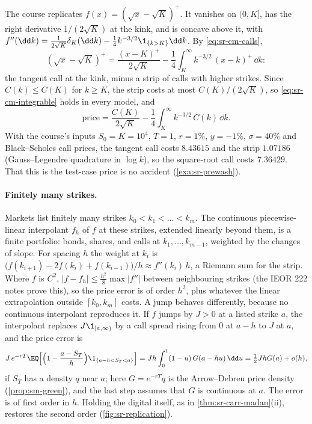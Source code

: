 \begin{example}\label{exa:sr-sqrt}
The course replicates $f(x)=(\sqrt x-\sqrt K)^+$. It vanishes on $(0,K]$, has the right derivative
$1/(2\sqrt K)$ at the kink, and is concave above it, with
$f''(\dd k)=\frac1{2\sqrt K}\delta_K(\dd k)-\frac14k^{-3/2}\1_{\{k>K\}}\dd k$. By \eqref{eq:sr-cm-calls},
\[
  (\sqrt x-\sqrt K)^+=\frac{(x-K)^+}{2\sqrt K}-\frac14\int_K^\infty k^{-3/2}\,(x-k)^+\,\dd k :
\]
the tangent call at the kink, minus a strip of calls with higher strikes. Since $C(k)\le C(K)$ for $k\ge K$,
the strip costs at most $C(K)/(2\sqrt K)$, so \eqref{eq:sr-cm-integrable} holds in every model, and
\[
  \text{price}=\frac{C(K)}{2\sqrt K}-\frac14\int_K^\infty k^{-3/2}\,C(k)\,\dd k .
\]
With the course's inputs $S_0=K=10^4$, $T=1$, $r=1\%$, $y=-1\%$, $\sigma=40\%$ and Black--Scholes call prices,
the tangent call costs $8.43615$ and the strip $1.07186$ (Gauss--Legendre quadrature in $\log k$), so the
square-root call costs $7.36429$. That this is the test-case price is no accident (\cref{exa:sr-prewash}).
\end{example}

\paragraph{Finitely many strikes.} Markets list finitely many strikes $k_0<k_1<\dots<k_m$. The
continuous piecewise-linear interpolant $f_h$ of $f$ at these strikes, extended linearly beyond them, is
a finite portfolio: bonds, shares, and calls at $k_1,\dots,k_{m-1}$, weighted by the changes of slope. For
spacing $h$ the weight at $k_i$ is $\big(f(k_{i+1})-2f(k_i)+f(k_{i-1})\big)/h\approx f''(k_i)\,h$, a Riemann sum
for the strip. Where $f$ is $C^2$, $|f-f_h|\le\frac{h^2}8\max|f''|$ between neighbouring strikes (the IEOR 222
notes prove this), so the price error is of order $h^2$, plus whatever the linear extrapolation outside
$[k_0,k_m]$ costs. A jump behaves differently, because no continuous interpolant reproduces it. If $f$ jumps
by $J>0$ at a listed strike $a$, the interpolant replaces $J\1_{[a,\infty)}$ by a call spread rising from $0$ at
$a-h$ to $J$ at $a$, and the price error is
\begin{equation}\label{eq:sr-jump-error}
  J\,e^{-rT}\EQ\Big[\Big(1-\frac{a-S_T}{h}\Big)\1_{\{a-h<S_T<a\}}\Big]
  =Jh\int_0^1(1-u)\,G(a-hu)\,\dd u=\tfrac12JhG(a)+o(h),
\end{equation}
if $S_T$ has a density $q$ near $a$; here $G=e^{-rT}q$ is the Arrow--Debreu price density (\cref{prop:sm-green}),
and the last step assumes that $G$ is continuous at $a$. The error is of first order in $h$. Holding the digital itself, as in
\cref{thm:sr-carr-madan}(ii), restores the second order (\cref{fig:sr-replication}).

